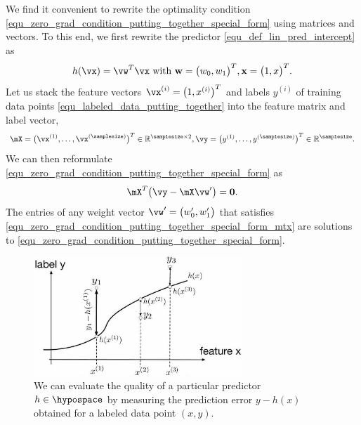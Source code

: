 \documentclass[12pt]{report}
\begin{document}
We find it convenient to rewrite the optimality condition \eqref{equ_zero_grad_condition_putting_together_special_form} 
using matrices and vectors. To this end, we first rewrite the predictor \eqref{equ_def_lin_pred_intercept} as 
$$ h(\vx) = \vw^{T} \vx \mbox{ with } \mathbf{w} = \big(w_{0},w_{1}\big)^{T}, \mathbf{x} = \big(1,x\big)^{T}.$$
Let us stack the feature vectors $\vx^{(i)} = \big(1,x^{(i)} \big)^{T}$ and labels $y^{(i)}$ of training data points 
\eqref{equ_labeled_data_putting_together} into the feature matrix and label vector, 
\begin{equation}
\mX  = \big(\vx^{(1)},\ldots,\vx^{(\samplesize)}\big)^{T} \in \mathbb{R}^{\samplesize \times 2}, \vy = \big(y^{(1)},\ldots,y^{(\samplesize)}\big)^{T} \in \mathbb{R}^{\samplesize}. 
\end{equation} 
We can then reformulate \eqref{equ_zero_grad_condition_putting_together_special_form} as 
\begin{equation}
\label{equ_zero_grad_condition_putting_together_special_form_mtx}
\mX^{T} \big( \vy - \mX \vw' \big) = \mathbf{0}. 
\end{equation} 
The entries of any weight vector $\vw' = \big(w_{0}',w_{1}'\big)$ that satisfies 
\eqref{equ_zero_grad_condition_putting_together_special_form_mtx} are solutions to 
\eqref{equ_zero_grad_condition_putting_together_special_form}. 




\begin{figure}[htbp]
    \centering
   \includegraphics[width=0.7\textwidth]{EmpError.jpg}  
    \caption{We can evaluate the quality of a particular predictor $h \in \hypospace$ by measuring the 
    prediction error $y- h(x)$ obtained for a labeled data point $(x,y)$. }
  \label{fig_emp_error}
\end{figure}
\end{document}

